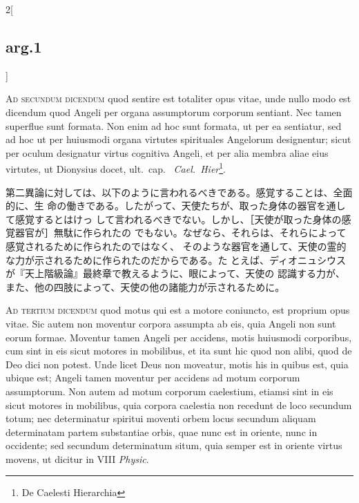 \documentclass[paper=a4paper,fontsize=10pt,jafontsize=9pt,titlepage]{jlreq}
\begin{document}
\begin{paracol}{2}[\subsection{arg.1}]
\switchcolumn*[\subsection{ad.2}]

{\scshape Ad secundum dicendum} quod sentire est totaliter opus vitae, unde
nullo modo est dicendum quod Angeli per organa assumptorum corporum
sentiant. Nec tamen superflue sunt formata. Non enim ad hoc sunt formata, ut per
ea sentiatur, sed ad hoc ut per huiusmodi organa virtutes spirituales Angelorum
designentur; sicut per oculum designatur virtus cognitiva Angeli, et per alia
membra aliae eius virtutes, ut Dionysius docet, ult.~cap.~{\itshape
Cael.~Hier}\footnote{De Caelesti Hierarchia}.

\switchcolumn

第二異論に対しては、以下のように言われるべきである。感覚することは、全面的に、生
命の働きである。したがって、天使たちが、取った身体の器官を通して感覚するとはけっ
して言われるべきでない。しかし、［天使が取った身体の感覚器官が］無駄に作られたの
でもない。なぜなら、それらは、それらによって感覚されるために作られたのではなく、
そのような器官を通して、天使の霊的な力が示されるために作られたのだからである。た
とえば、ディオニュシウスが『天上階級論』最終章で教えるように、眼によって、天使の
認識する力が、また、他の四肢によって、天使の他の諸能力が示されるために。

\switchcolumn*[\subsection{ad.3}]

{\scshape Ad tertium dicendum} quod motus qui est a motore coniuncto, est
proprium opus vitae. Sic autem non moventur corpora assumpta ab eis, quia Angeli
non sunt eorum formae. Moventur tamen Angeli per accidens, motis huiusmodi
corporibus, cum sint in eis sicut motores in mobilibus, et ita sunt hic quod non
alibi, quod de Deo dici non potest. Unde licet Deus non moveatur, motis his in
quibus est, quia ubique est; Angeli tamen moventur per accidens ad motum
corporum assumptorum. Non autem ad motum corporum caelestium, etiamsi sint in
eis sicut motores in mobilibus, quia corpora caelestia non recedunt de loco
secundum totum; nec determinatur spiritui moventi orbem locus secundum aliquam
determinatam partem substantiae orbis, quae nunc est in oriente, nunc in
occidente; sed secundum determinatum situm, quia semper est in oriente virtus
movens, ut dicitur in VIII {\itshape Physic}.

\switchcolumn


\end{paracol}
\end{document}
